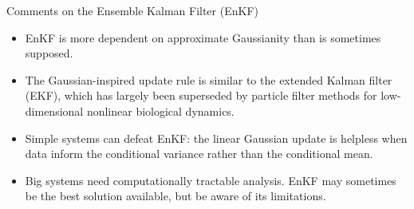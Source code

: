 \documentclass{beamer}
\begin{document}
\begin{frame}{Comments on the Ensemble Kalman Filter (EnKF)}

  \begin{itemize}
  \item EnKF is more dependent on approximate Gaussianity than is sometimes supposed.

    \vspace{2mm}
    
  \item The Gaussian-inspired update rule is similar to the extended Kalman filter (EKF), which has largely been superseded by particle filter methods for low-dimensional nonlinear biological dynamics.

    \vspace{2mm}
    
\item Simple systems can defeat EnKF: the linear Gaussian update is helpless when data inform the conditional variance rather than the conditional mean.

  \vspace{2mm}
  
    \item Big systems need computationally tractable analysis. EnKF may sometimes be the best solution available, but be aware of its limitations.

  \end{itemize}

\end{frame}
\end{document}
